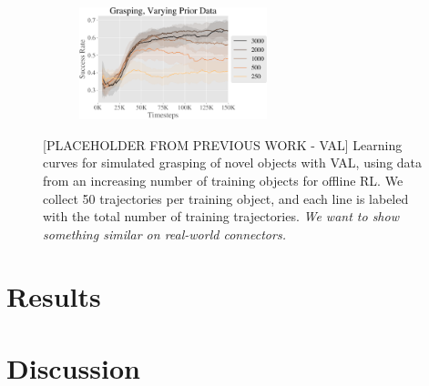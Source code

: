 \documentclass{article}
\begin{document}
\begin{figure}[t]
    \centering
    \begin{subfigure}[b]{0.99\linewidth}
        \center
        \includegraphics[width=0.6\textwidth]{imgs/vary_data-crop.pdf}
    \end{subfigure}

    \caption{[PLACEHOLDER FROM PREVIOUS WORK - VAL] Learning curves for simulated grasping of novel objects with VAL, using data from an increasing number of training objects for offline RL. We collect 50 trajectories per training object, and each line is labeled with the total number of training trajectories. \textit{We want to show something similar on real-world connectors.} }

    \label{fig:novel_obj}
    \vspace{-0.5cm}
\end{figure}

\section{Results}

\section{Discussion}



\end{document}
